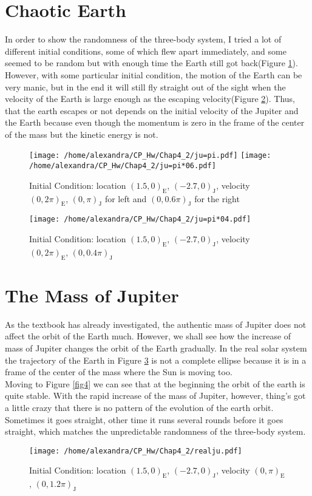 \documentclass[11pt,twoside,a4paper]{article}
\begin{document}
\newpage

\section{Chaotic Earth}
In order to show the randomness of the three-body system, I tried a lot of different initial conditions, some of which flew apart immediately, and some seemed to be random but with enough time the Earth still got back(Figure \ref{fig1}). However, with some particular initial condition, the motion of the Earth can be very manic, but in the end it will still fly straight out of the sight when the velocity of the Earth is large enough as the escaping velocity(Figure \ref{marker}). Thus, that the earth escapes or not depends on the initial velocity of the Jupiter and the Earth because even though the momentum is zero in the frame of the center of the mass but the kinetic energy is not. 
\begin{figure}[htbp]
\centering
\texttt{[image: /home/alexandra/CP\_Hw/Chap4\_2/ju=pi.pdf]}
\texttt{[image: /home/alexandra/CP\_Hw/Chap4\_2/ju=pi*06.pdf]}
\caption{Initial Condition: location $(1.5,0)_\mathrm{E}$, $(-2.7,0)_\mathrm{J}$,    velocity $(0,2\pi)_\mathrm{E}$, $(0,\pi)_\mathrm{J}$ for left and $(0,0.6\pi)_\mathrm{J}$ for the right}
\label{fig1}
\end{figure}

\begin{figure}[htbp]
\centering
\texttt{[image: /home/alexandra/CP\_Hw/Chap4\_2/ju=pi*04.pdf]}
\caption{Initial Condition: location $(1.5,0)_\mathrm{E}$, $(-2.7,0)_\mathrm{J}$,    velocity $(0,2\pi)_\mathrm{E}$, $(0,0.4\pi)_\mathrm{J}$}
\label{marker}
\end{figure}

\section{The Mass of Jupiter}
\quad As the textbook has already investigated, the authentic mass of Jupiter does not affect the orbit of the Earth much. However, we shall see how the increase of mass of Jupiter changes the orbit of the Earth gradually. In the real solar system the trajectory of the Earth in Figure \ref{fig3} is not a complete ellipse because it is in a frame of the center of the mass where the Sun is moving too.\\ 
\quad Moving to Figure \ref{fig4} we can see that at the beginning the orbit of the earth is quite stable. With the rapid increase of the mass of Jupiter, however, thing's got a little crazy that there is no pattern of the evolution of the earth orbit. Sometimes it goes straight, other time it runs several rounds before it goes straight, which matches the unpredictable randomness of the three-body system.
\begin{figure}[htbp]
\centering
\texttt{[image: /home/alexandra/CP\_Hw/Chap4\_2/realju.pdf]}
\caption{Initial Condition: location $(1.5,0)_\mathrm{E}$, $(-2.7,0)_\mathrm{J}$,    velocity $(0,\pi)_\mathrm{E}$, $(0,1.2\pi)_\mathrm{J}$}
\label{fig3}
\end{figure}
\end{document}
